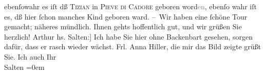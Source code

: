 \begin{ledgroupsized}[t]{13cm}
                    ebenſowahr es iſt dß \textsc{Tizian} in \textsc{Pieve di Cadore} geboren word\textcolor{gray}{en}, ebenſo wahr iſt es, dß hier ſchon manches Kind
                    geboren ward.\pend
           \pstart
           – Wir haben eine ſchöne Tour gemacht; näheres mündlich. Ihnen gehts hoffentlich
                    gut, und wir grüßen Sie herzlich!\pend
           \pstart \spacefill\mbox{Arthur}\pend{}\pstart
           \noindent{}{[}hs. Salten:{]} Ich habe Sie hier ohne Backenbart gesehen, sorgen
                    dafür, dass er rasch wieder wächst. Frl. Anna
                        Hiller, die mir das Bild zeigte grüßt Sie. Ich auch\pend
           \pstart
           Ihr{\\[\baselineskip]}\spacefill\mbox{Salten}\pend
           \leftskip=0em{}\endnumbering{}\end{ledgroupsized}  \newcommand{\dateiname}{L00260}\newcommand{\titel}{Arthur Schnitzler und Felix Salten an Richard Beer-Hofmann, 27. 8. 1893}\newcommand{\editorInnen}{Martin Anton Müller und Gerd-Hermann Susen}
      